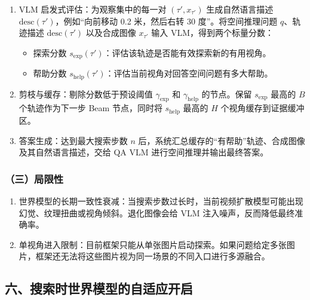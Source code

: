\begin{enumerate}
\def\labelenumi{\arabic{enumi}.}
\setcounter{enumi}{1}
\tightlist
\item
  VLM 启发式评估：为观察集中的每一对 \((\tau', x_{\tau'})\) 生成自然语言描述 \(\mathrm{desc}(\tau')\)，例如``向前移动 0.2 米，然后右转 30 度''。将空间推理问题 \(q\)、轨迹描述 \(\mathrm{desc}(\tau')\) 以及合成图像 \(x_{\tau'}\) 输入 VLM，得到两个标量分数：

  \begin{itemize}
  \tightlist
  \item
    探索分数 \(s_{\mathrm{exp}}(\tau')\)：评估该轨迹是否能有效探索新的有用视角。
  \item
    帮助分数 \(s_{\mathrm{help}}(\tau')\)：评估当前视角对回答空间问题有多大帮助。
  \end{itemize}
\item
  剪枝与缓存：剔除分数低于预设阈值 \(\gamma_{\mathrm{exp}}\) 和 \(\gamma_{\mathrm{help}}\) 的节点。保留 \(s_{\mathrm{exp}}\) 最高的 \(B\) 个轨迹作为下一步 Beam 节点，同时将 \(s_{\mathrm{help}}\) 最高的 \(H\) 个视角缓存到证据缓冲区。
\item
  答案生成：达到最大搜索步数 \(n\) 后，系统汇总缓存的``有帮助''轨迹、合成图像及其自然语言描述，交给 QA VLM 进行空间推理并输出最终答案。
\end{enumerate}

\hypertarget{ux4e09ux5c40ux9650ux6027}{%
\subsubsection{（三）局限性}\label{ux4e09ux5c40ux9650ux6027}}

\begin{enumerate}
\def\labelenumi{\arabic{enumi}.}
\tightlist
\item
  世界模型的长期一致性衰减：当搜索步数过长时，当前视频扩散模型可能出现幻觉、纹理扭曲或视角倾斜。退化图像会给 VLM 注入噪声，反而降低最终准确率。
\item
  单视角进入限制：目前框架只能从单张图片启动探索。如果问题给定多张图片，框架还无法将这些图片视为同一场景的不同入口进行多源融合。
\end{enumerate}

\hypertarget{ux516dux641cux7d22ux65f6ux4e16ux754cux6a21ux578bux7684ux81eaux9002ux5e94ux5f00ux542f}{%
\subsection{六、搜索时世界模型的自适应开启}\label{ux516dux641cux7d22ux65f6ux4e16ux754cux6a21ux578bux7684ux81eaux9002ux5e94ux5f00ux542f}}

